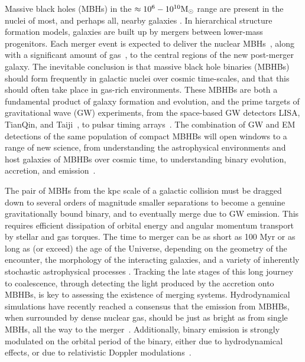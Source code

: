 \documentclass[tightenlines,superscriptaddress,amsmath,amssymb,prl,12pt]{revtex4-1}
\begin{document}
Massive black holes (MBHs) in the $\approx 10^6-10^{10}{\rm M_\odot}$
range are present in the nuclei of most, and perhaps all, nearby
galaxies \cite{KormendyHo2013}.  In hierarchical structure formation
models, galaxies are built up by mergers between lower-mass
progenitors. Each merger event is expected to deliver the nuclear
MBHs~\cite{springel2005,2021ApJ...923..146G}, along with a significant
amount of gas~\cite{bh92}, to the central regions of the new
post-merger galaxy. The inevitable conclusion is that massive black
hole binaries (MBHBs) should form frequently in galactic nuclei over
cosmic time-scales, and that this should often take place in gas-rich
environments.  These MBHBs are both a fundamental product of galaxy
formation and evolution, and the prime targets of gravitational wave
(GW) experiments, from the space-based GW detectors LISA, TianQin, and
Taiji~\cite{LISA,tianqin,taiji}, to pulsar timing
arrays~\cite{Goulding2019, Xin2021, CaseyClyde2022, Ming2023,
  Koss2023}.  The combination of GW and EM detections of the same
population of compact MBHBs will open windows to a range of new
science, from understanding the astrophysical environments and host
galaxies of MBHBs over cosmic time, to understanding binary evolution,
accretion, and emission~\cite{MMMBA-decadal}.


The pair of MBHs from the kpc scale of a galactic collision must be
dragged down to several orders of magnitude smaller separations to
become a genuine gravitationally bound binary, and to eventually merge
due to GW emission. This requires efficient dissipation of orbital
energy and angular momentum transport by stellar and gas torques. The
time to merger can be as short as 100 Myr or as long as (or exceed)
the age of the Universe, depending on the geometry of the encounter,
the morphology of the interacting galaxies, and a variety of
inherently stochastic astrophysical processes
\cite{2023LRR-astro}. Tracking the late stages of this long journey to
coalescence, through detecting the light produced by the accretion
onto MBHBs, is key to assessing the existence of merging
systems. Hydrodynamical simulations have recently reached a consensus
that the emission from MBHBs, when surrounded by dense nuclear gas,
should be just as bright as from single MBHs, all the way to the
merger~\cite{Krauth+2023}. Additionally, binary emission is strongly
modulated on the orbital period of the binary, either due to
hydrodynamical effects, or due to relativistic Doppler
modulations~\cite{Bogdanovic+2022}.

 
\end{document}
